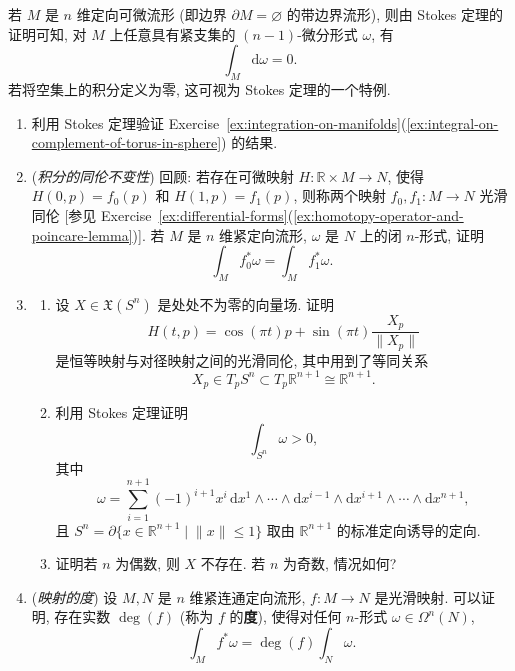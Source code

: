 \begin{RiemannRemark}\label{rem:stokes-on-manifold-without-boundary}
若 $M$ 是 $n$ 维定向可微流形 (即边界 $\partial M=\varnothing$ 的带边界流形), 则由 Stokes 定理的证明可知, 对 $M$ 上任意具有紧支集的 $(n-1)$-微分形式 $\omega$, 有
\[
  \int_M\mathrm{d}\omega=0.
\]
若将空集上的积分定义为零, 这可视为 Stokes 定理的一个特例.
\end{RiemannRemark}

\begin{RiemannExercise}\label{ex:stokes-theorem}
\begin{enumerate}[label=(\arabic*),ref=\arabic*,leftmargin=*]
\item\label{ex:torus-complement-integral-by-stokes} 利用 Stokes 定理验证 Exercise~\ref{ex:integration-on-manifolds}(\ref{ex:integral-on-complement-of-torus-in-sphere}) 的结果.
\item\label{ex:homotopy-invariance-of-integral} (\emph{积分的同伦不变性}) 回顾: 若存在可微映射 $H:\mathbb{R}\times M\to N$, 使得 $H(0,p)=f_0(p)$ 和 $H(1,p)=f_1(p)$, 则称两个映射 $f_0,f_1:M\to N$ 光滑同伦 [参见 Exercise~\ref{ex:differential-forms}(\ref{ex:homotopy-operator-and-poincare-lemma})]. 若 $M$ 是 $n$ 维紧定向流形, $\omega$ 是 $N$ 上的闭 $n$-形式, 证明
\[
  \int_Mf_0^*\omega=\int_Mf_1^*\omega.
\]
\item\label{ex:sphere-vector-field-and-antipodal-homotopy}
\begin{enumerate}[label=(\alph*),leftmargin=*]
\item 设 $X\in\mathfrak{X}(S^n)$ 是处处不为零的向量场. 证明
\[
  H(t,p)=\cos(\pi t)p+\sin(\pi t)\frac{X_p}{\lVert X_p\rVert}
\]
是恒等映射与对径映射之间的光滑同伦, 其中用到了等同关系
\[
  X_p\in T_pS^n\subset T_p\mathbb{R}^{n+1}\cong\mathbb{R}^{n+1}.
\]
\item 利用 Stokes 定理证明
\[
  \int_{S^n}\omega>0,
\]
其中
\[
  \omega=\sum_{i=1}^{n+1}(-1)^{i+1}x^i\,\mathrm{d}x^1\wedge\cdots\wedge
  \mathrm{d}x^{i-1}\wedge\mathrm{d}x^{i+1}\wedge\cdots\wedge\mathrm{d}x^{n+1},
\]
且 $S^n=\partial\{x\in\mathbb{R}^{n+1}\mid\lVert x\rVert\leq1\}$ 取由 $\mathbb{R}^{n+1}$ 的标准定向诱导的定向.
\item 证明若 $n$ 为偶数, 则 $X$ 不存在. 若 $n$ 为奇数, 情况如何?
\end{enumerate}
\item\label{ex:degree-of-map} (\emph{映射的度}) 设 $M,N$ 是 $n$ 维紧连通定向流形, $f:M\to N$ 是光滑映射. 可以证明, 存在实数 $\deg(f)$ (称为 $f$ 的\textbf{度}), 使得对任何 $n$-形式 $\omega\in\Omega^n(N)$,
\[
  \int_Mf^*\omega=\deg(f)\int_N\omega.
\]
\end{enumerate}
\end{RiemannExercise}
